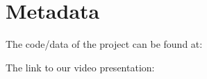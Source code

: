 \section{Metadata}

\noindent
The code/data of the project can be found at:
\begin{center}
\end{center}
The link to our video presentation:
\begin{center}
\end{center}

